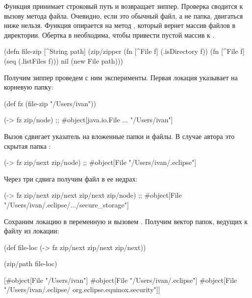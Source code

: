 Функция  принимает строковый путь и возвращает зиппер. Проверка
 сводится к вызову метода  файла. Очевидно, если это
обычный файл, а не папка, двигаться ниже нельзя. Функция  опирается на
метод , который вернет массив файлов в директории. Обертка в 
необходима, чтобы привести пустой массив к .

\begin{english}
  \begin{clojure}
(defn file-zip [^String path]
  (zip/zipper
   (fn [^File f] (.isDirectory f))
   (fn [^File f] (seq (.listFiles f)))
   nil
   (new File path)))
  \end{clojure}
\end{english}

Получим зиппер проведем с ним эксперименты. Первая локация указывает на
корневую папку:

\begin{english}
  \begin{clojure}
(def fz (file-zip "/Users/ivan"))

(-> fz zip/node)
;; #object[java.io.File ... "/Users/ivan"]
  \end{clojure}
\end{english}

Вызов  сдвигает указатель на вложенные папки и файлы. В случае автора
это скрытая папка :

\begin{english}
  \begin{clojure}
(-> fz zip/next zip/node)
;; #object[File "/Users/ivan/.eclipse"]
  \end{clojure}
\end{english}

Через три сдвига получим файл  в ее недрах:

\begin{english}
  \begin{clojure}
(-> fz zip/next zip/next zip/next zip/node)
;; #object[File "/Users/ivan/.eclipse/.../secure_storage"]
  \end{clojure}
\end{english}

Сохраним локацию в переменную и вызовем . Получим вектор папок,
ведущих к файлу из локации:

\begin{english}
  \begin{clojure}
(def file-loc
  (-> fz zip/next zip/next zip/next))

(zip/path file-loc)

[#object[File "/Users/ivan"]
 #object[File "/Users/ivan/.eclipse"]
 #object[File "/Users/ivan/.eclipse/
                      org.eclipse.equinox.security"]]
  \end{clojure}
\end{english}

